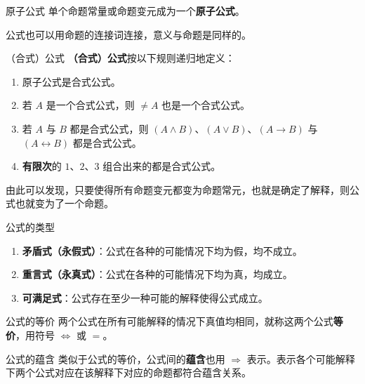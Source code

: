 
\begin{definition}{原子公式}
单个命题常量或命题变元成为一个\textbf{原子公式}。
\end{definition}

公式也可以用命题的连接词连接，意义与命题是同样的。


\begin{definition}{（合式）公式}
\textbf{（合式）公式}按以下规则递归地定义：
\begin{enumerate}
\item 原子公式是合式公式。
\item 若 $A$ 是一个合式公式，则 $\neq A$ 也是一个合式公式。
\item 若 $A$ 与 $B$ 都是合式公式，则 $(A \land B)$、$(A \lor B)$、$(A \to B)$ 与 $(A \leftrightarrow B)$ 都是合式公式。
\item \textbf{有限次}的 $1$、$2$、$3$ 组合出来的都是合式公式。
\end{enumerate}
由此可以发现，只要使得所有命题变元都变为命题常元，也就是确定了解释，则公式也就变为了一个命题。

\end{definition}
\begin{definition}{公式的类型}
\begin{enumerate}
\item \textbf{矛盾式（永假式）}：公式在各种的可能情况下均为假，均不成立。
\item \textbf{重言式（永真式）}：公式在各种的可能情况下均为真，均成立。
\item \textbf{可满足式}：公式存在至少一种可能的解释使得公式成立。
\end{enumerate}
\end{definition}

\begin{definition}{公式的等价}
两个公式在所有可能解释的情况下真值均相同，就称这两个公式\textbf{等价}，用符号 $\Leftrightarrow$ 或 $=$。
\end{definition}

\begin{definition}{公式的蕴含}
类似于公式的等价，公式间的\textbf{蕴含}也用 $\Rightarrow$ 表示。表示各个可能解释下两个公式对应在该解释下对应的命题都符合蕴含关系。
\end{definition}